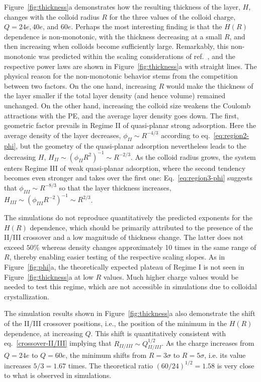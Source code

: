 \documentclass[journal=mamobx, manuscript=article]{achemso}
\begin{document}
Figure~\ref{fig:thickness}a demonstrates how the resulting thickness of the layer, $H$, changes with the colloid radius $R$ for the three values of the colloid charge, $Q = 24e, 40e$, and $60e$. Perhaps the most interesting finding is that the $H (R)$ dependence is non-monotonic, with the thickness decreasing at a small $R$, and then increasing when colloids become sufficiently large. Remarkably, this non-monotonic was predicted within the scaling considerations of ref.~, and the respective power laws are shown in Figure~\ref{fig:thickness}a with straight lines. The physical reason for the non-monotonic behavior stems from the competition between two factors. On the one hand, increasing $R$ would make the thickness of the layer smaller if the total layer density (and hence volume) remained unchanged. On the other hand, increasing the colloid size weakens the Coulomb attractions with the PE, and the average layer density goes down. The first, geometric factor prevails in Regime II of quasi-planar strong adsorption. Here the average density of the layer decreases, $\phi_{II} \sim R^{-4/3}$ according to eq.~\ref{eq:region2-phi}, but the geometry of the quasi-planar adsorption nevertheless leads to the decreasing $H$, $H_{II} \sim \left( \phi_{II} R^2 \right)^{-1} \sim R^{-2/3}$. As the colloid radius grows, the system enters Regime III of weak quasi-planar adsorption, where the second tendency becomes even stronger and takes over the first one: Eq.~\ref{eq:region3-phi} suggests that $\phi_{III} \sim R^{-8/3}$ so that the layer thickness increases, $H_{III} \sim \left( \phi_{III} R^{-2} \right)^{-1} \sim R^{2/3} $.

The simulations do not reproduce quantitatively the predicted exponents for the $H(R)$ dependence, which should be primarily attributed to the presence of the II/III crossover and a low magnitude of thickness change. The latter does not exceed $50\%$ whereas density changes approximately 10 times in the same range of $R$, thereby enabling easier testing of the respective scaling slopes. As in Figure~\ref{fig:phi}a, the theoretically expected plateau of Regime I is not seen in Figure~\ref{fig:thickness}a at low $R$ values. Much higher charge values would be needed to test this regime, which are not accessible in simulations due to colloidal crystallization.  

The simulation results shown in Figure~\ref{fig:thickness}a also demonstrate the shift of the II/III crossover positions, i.e., the position of the minimum in the $H (R)$ dependence, at increasing $Q$. This shift is quantitatively consistent with eq.~\ref{crossover-II/III} implying that $R_{II/III} \sim Q_{II/III}^{1/2}$. As the charge increases from $Q = 24e$ to $Q = 60e$, the minimum shifts from $R = 3 \sigma$ to $R= 5 \sigma$, i.e. its value increases $5/3 = 1.67$ times. The theoretical ratio $(60 / 24)^{1/2} = 1.58$ is very close to what is observed in simulations. 
\end{document}
